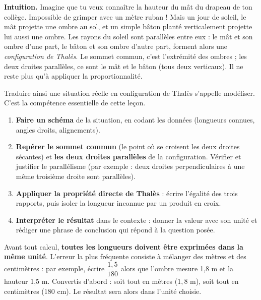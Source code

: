 \documentclass[11pt]{article}
\newcommand{\cle}[1]{{\popxbold\color{popdark}#1}}
\begin{document}
\textbf{Intuition.} Imagine que tu veux connaître la hauteur du mât du drapeau de ton collège. Impossible de grimper avec un mètre ruban ! Mais un jour de soleil, le mât projette une ombre au sol, et un simple bâton planté verticalement projette lui aussi une ombre. Les rayons du soleil sont parallèles entre eux : le mât et son ombre d'une part, le bâton et son ombre d'autre part, forment alors une \emph{configuration de Thalès}. Le sommet commun, c'est l'extrémité des ombres ; les deux droites parallèles, ce sont le mât et le bâton (tous deux verticaux). Il ne reste plus qu'à appliquer la proportionnalité.

Traduire ainsi une situation réelle en configuration de Thalès s'appelle \cle{modéliser}. C'est la compétence essentielle de cette leçon.

\begin{methode}
\begin{enumerate}
\item \textbf{Faire un schéma} de la situation, en codant les données (longueurs connues, angles droits, alignements).
\item \textbf{Repérer le sommet commun} (le point où se croisent les deux droites sécantes) et \textbf{les deux droites parallèles} de la configuration. Vérifier et justifier le parallélisme (par exemple : deux droites perpendiculaires à une même troisième droite sont parallèles).
\item \textbf{Appliquer la propriété directe de Thalès} : écrire l'égalité des trois rapports, puis isoler la longueur inconnue par un produit en croix.
\item \textbf{Interpréter le résultat} dans le contexte : donner la valeur avec son unité et rédiger une phrase de conclusion qui répond à la question posée.
\end{enumerate}
\end{methode}

\begin{attention}
Avant tout calcul, \textbf{toutes les longueurs doivent être exprimées dans la même unité}. L'erreur la plus fréquente consiste à mélanger des mètres et des centimètres : par exemple, écrire $\dfrac{1{,}5}{180}$ alors que l'ombre mesure 1,8 m et la hauteur 1,5 m. Convertis d'abord : soit tout en mètres ($1{,}8$ m), soit tout en centimètres ($180$ cm). Le résultat sera alors dans l'unité choisie.
\end{attention}
\end{document}
